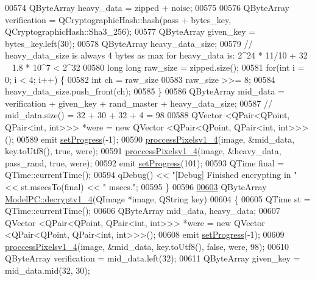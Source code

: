\begin{DoxyCode}
00574     QByteArray heavy\_data = zipped + noise;
00575 
00576     QByteArray verification = QCryptographicHash::hash(pass + bytes\_key, QCryptographicHash::Sha3\_256);
00577     QByteArray given\_key = bytes\_key.left(30);
00578     QByteArray heavy\_data\_size;
00579     \textcolor{comment}{// heavy\_data\_size is always 4 bytes as max for heavy\_data is: 2^24 * 11/10 + 32 ~ 1.8 * 10^7 < 2^32}
00580     \textcolor{keywordtype}{long} \textcolor{keywordtype}{long} raw\_size = zipped.size();
00581     \textcolor{keywordflow}{for}(\textcolor{keywordtype}{int} i = 0; i < 4; i++) \{
00582         \textcolor{keywordtype}{int} ch = raw\_size %
00583         raw\_size >>= 8;
00584         heavy\_data\_size.push\_front(ch);
00585     \}
00586     QByteArray mid\_data = verification + given\_key + rand\_master + heavy\_data\_size;
00587     \textcolor{comment}{// mid\_data.size() = 32 + 30 + 32 + 4 = 98}
00588     QVector <QPair<QPoint, QPair<int, int>>> *were = \textcolor{keyword}{new} QVector <QPair<QPoint, QPair<int, int>>>();
00589     emit \hyperlink{class_model_p_c_afdcd80f0ed5062e145a71f09b0897547}{setProgress}(-1);
00590     \hyperlink{class_model_p_c_a5cdb4d1d61ff62ee9d45b496a7dbf1fb}{proccessPixelsv1\_4}(image, &mid\_data, key.toUtf8(), \textcolor{keyword}{true}, were);
00591     \hyperlink{class_model_p_c_a5cdb4d1d61ff62ee9d45b496a7dbf1fb}{proccessPixelsv1\_4}(image, &heavy\_data, pass\_rand, \textcolor{keyword}{true}, were);
00592     emit \hyperlink{class_model_p_c_afdcd80f0ed5062e145a71f09b0897547}{setProgress}(101);
00593     QTime \textcolor{keyword}{final} = QTime::currentTime();
00594     qDebug() << \textcolor{stringliteral}{"[Debug] Finished encrypting in "} << st.msecsTo(\textcolor{keyword}{final}) << \textcolor{stringliteral}{" msecs."};
00595 \}
00596 
\hypertarget{modelpc_8cpp_source.tex_l00603}{}\hyperlink{class_model_p_c_a7a1f7d491e1bde16936190b9e90896b0}{00603} QByteArray \hyperlink{class_model_p_c_a7a1f7d491e1bde16936190b9e90896b0}{ModelPC::decryptv1\_4}(QImage *image, QString key)
00604 \{
00605     QTime st = QTime::currentTime();
00606     QByteArray mid\_data, heavy\_data;
00607     QVector <QPair<QPoint, QPair<int, int>>> *were = \textcolor{keyword}{new} QVector <QPair<QPoint, QPair<int, int>>>();
00608     emit \hyperlink{class_model_p_c_afdcd80f0ed5062e145a71f09b0897547}{setProgress}(-1);
00609     \hyperlink{class_model_p_c_a5cdb4d1d61ff62ee9d45b496a7dbf1fb}{proccessPixelsv1\_4}(image, &mid\_data, key.toUtf8(), \textcolor{keyword}{false}, were, 98);
00610     QByteArray verification = mid\_data.left(32);
00611     QByteArray given\_key = mid\_data.mid(32, 30);

\end{DoxyCode}
